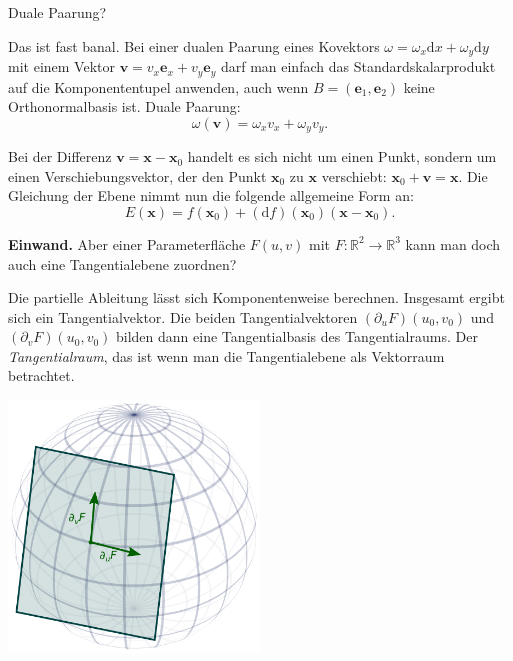 \documentclass[9pt]{beamer}
\newcommand{\R}{\mathbb R}
\begin{document}
\begin{frame}
Duale Paarung?
\end{frame}

\begin{frame}
Das ist fast banal. Bei einer dualen Paarung eines Kovektors
$\omega=\omega_x\mathrm dx+\omega_y\mathrm dy$ mit
einem Vektor $\mathbf v = v_x\mathbf e_x+v_y\mathbf e_y$ darf man einfach
das Standardskalarprodukt auf die Komponententupel anwenden, auch
wenn $B=(\mathbf e_1,\mathbf e_2)$ keine Orthonormalbasis ist.
Duale Paarung:
\[\omega(\mathbf v) = \omega_x v_x+\omega_y v_y.\]
\end{frame}

\begin{frame}
Bei der Differenz $\mathbf v=\mathbf x-\mathbf x_0$ handelt es sich nicht
um einen Punkt, sondern um einen Verschiebungsvektor, der den Punkt
$\mathbf x_0$ zu $\mathbf x$ verschiebt: $\mathbf x_0+\mathbf v = \mathbf x$.
Die Gleichung der Ebene nimmt nun die folgende allgemeine Form an:
\[E(\mathbf x) = f(\mathbf x_0) + (\mathrm df)(\mathbf x_0)(\mathbf x-\mathbf x_0).\]
\end{frame}

\begin{frame}
\textbf{Einwand.} Aber einer Parameterfläche $F(u,v)$ mit
$F\colon\R^2\to\R^3$ kann man doch auch eine Tangentialebene zuordnen?
\end{frame}

\begin{frame}
Die partielle Ableitung lässt sich Komponentenweise berechnen.
Insgesamt ergibt sich ein Tangentialvektor. Die beiden
Tangentialvektoren $(\partial_u F)(u_0,v_0)$ und $(\partial_v F)(u_0,v_0)$
bilden dann eine Tangentialbasis des Tangentialraums. Der
\emph{Tangentialraum}, das ist wenn man die Tangentialebene als
Vektorraum betrachtet.
\end{frame}

\begin{frame}
\begin{center}
\includegraphics[width=0.5\textwidth]{img/Tangentialebene.pdf}
\end{center}
\end{frame}
\end{document}
